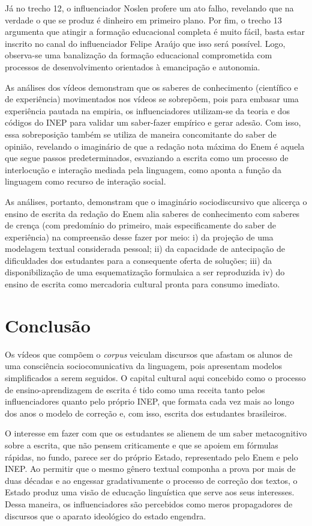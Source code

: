 \documentclass[portuguese]{textolivre}
\begin{document}
Já no trecho 12, o influenciador Noslen profere um ato falho, revelando que na verdade o que se produz é dinheiro em primeiro plano.  Por fim, o trecho 13 argumenta que atingir a formação educacional completa é muito fácil, basta estar inscrito no canal do influenciador Felipe Araújo que isso será possível. Logo, observa-se uma banalização da formação educacional comprometida com processos de desenvolvimento orientados à emancipação e autonomia. 

As análises dos vídeos demonstram que os saberes de conhecimento (científico e de experiência) movimentados nos vídeos se sobrepõem, pois para embasar uma experiência pautada na empiria, os influenciadores utilizam-se da teoria e dos códigos do INEP para validar um saber-fazer empírico e gerar adesão. Com isso, essa sobreposição também se utiliza de maneira concomitante do saber de opinião, revelando o imaginário de que a redação nota máxima do Enem é aquela que segue passos predeterminados, esvaziando a escrita como um processo de interlocução e interação mediada pela linguagem, como aponta a função da linguagem como recurso de interação social. 

As análises, portanto, demonstram que o imaginário sociodiscursivo que alicerça o ensino de escrita da redação do Enem alia saberes de conhecimento com saberes de crença (com predomínio do primeiro, mais especificamente do saber de experiência) na compreensão desse fazer por meio: i) da projeção de uma modelagem textual considerada pessoal; ii) da capacidade de antecipação de dificuldades dos estudantes para a consequente oferta de soluções; iii) da disponibilização de uma esquematização formulaica a ser reproduzida iv) do ensino de escrita como mercadoria cultural pronta para consumo imediato.

\section{Conclusão}
Os vídeos que compõem o \textit{corpus} veiculam discursos que afastam os alunos de uma consciência sociocomunicativa da linguagem, pois apresentam modelos simplificados a serem seguidos. O capital cultural aqui concebido como o processo de ensino-aprendizagem de escrita é tido como uma receita tanto pelos influenciadores quanto pelo próprio INEP, que formata cada vez mais ao longo dos anos o modelo de correção e, com isso, escrita dos estudantes brasileiros. 

O interesse em fazer com que os estudantes se alienem de um saber metacognitivo sobre a escrita, que não pensem criticamente e que se apoiem em fórmulas rápidas, no fundo, parece ser do próprio Estado, representado pelo Enem e pelo INEP. Ao permitir que o mesmo gênero textual componha a prova por mais de duas décadas e ao engessar gradativamente o processo de correção dos textos, o Estado produz uma visão de educação linguística que serve aos seus interesses. Dessa maneira, os influenciadores são percebidos como meros propagadores de discursos que o aparato ideológico do estado engendra.
\end{document}
